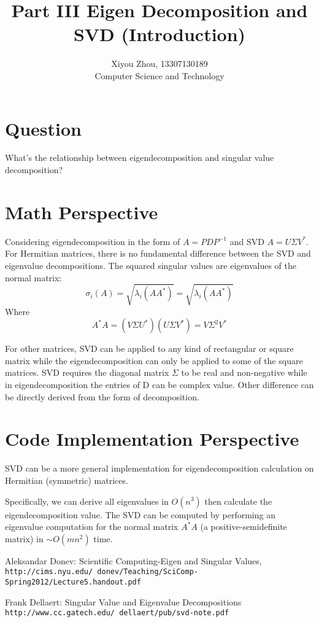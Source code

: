 \documentclass[11pt, oneside]{article}
\begin{document}
\title{Part III Eigen Decomposition and SVD (Introduction)}
\author{Xiyou Zhou, 13307130189 \\ Computer Science and Technology}
\maketitle
\section{Question}
What's the relationship between eigendecomposition and singular value decomposition?
\section{Math Perspective}

Considering eigendecomposition in the form of $A = PDP^{-1}$ and SVD $A=U\Sigma{}V^*$.\\

For Hermitian matrices, there is no fundamental difference between the SVD and eigenvalue decompositions. The squared singular values are eigenvalues of the normal matrix:
$$\sigma_i(A)=\sqrt{\lambda_i(AA^*)}=\sqrt{\lambda_i(AA^*)}$$
Where
$$A^*A=(V\Sigma{}U^*)(U\Sigma{}V^*)=V\Sigma^2V^*$$

For other matrices, SVD can be applied to any kind of rectangular or square matrix while the eigendecomposition can only be applied to some of the square matrices. SVD requires the diagonal matrix $\Sigma$ to be real and non-negative while in eigendecomposition the entries of D can be complex value. Other difference can be directly derived from the form of decomposition.

\section{Code Implementation Perspective}
SVD can be a more general implementation for eigendecomposition calculation on Hermitian (symmetric) matrices.

Specifically, we can derive all eigenvalues in $O(n^3)$ then calculate the eigendecomposition value. The SVD can be computed by performing an eigenvalue computation for the normal matrix $A^*A$ (a positive-semidefinite matrix) in $\sim{}O(mn^2)$ time.

\begin{thebibliography}{9}
Aleksandar Donev: Scientific Computing-Eigen and Singular Values,
\\\texttt{http://cims.nyu.edu/~donev/Teaching/SciComp-Spring2012/Lecture5.handout.pdf}

Frank Dellaert: Singular Value and Eigenvalue Decompositions
\\\texttt{http://www.cc.gatech.edu/~dellaert/pub/svd-note.pdf}
\end{thebibliography}
\end{document}
